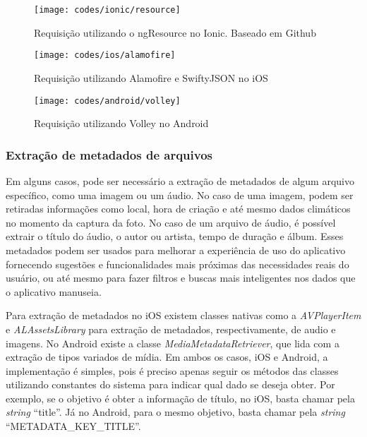 \begin{figure}[H]
	\centering
	\texttt{[image: codes/ionic/resource]}
	\caption[Requisição utilizando o ngResource no Ionic]{Requisição utilizando o ngResource no Ionic. Baseado em Github\protect\footnotemark}
	\label{fig:resource-ionic}
\end{figure}
\begin{figure}[H]
	\centering
	\texttt{[image: codes/ios/alamofire]}
	\caption[Requisição utilizando Alamofire e SwiftyJSON no iOS]{Requisição utilizando Alamofire e SwiftyJSON no iOS}
	\label{fig:alamofire-ios}
\end{figure} 
\begin{figure}[H]
	\centering
	\texttt{[image: codes/android/volley]}
	\caption[Requisição utilizando Volley no Android]{Requisição utilizando Volley no Android}
	\label{fig:volley-android}
\end{figure}


\subsubsection{Extração de metadados de arquivos} \label{subsubsec:extracaometadata}
Em alguns casos, pode ser necessário a extração de metadados de algum arquivo específico, como uma imagem ou um áudio. No caso de uma imagem, podem ser retiradas informações como local, hora de criação e até mesmo 
dados climáticos no momento da captura da foto. No caso de um arquivo de áudio, é possível extrair o título do áudio, o autor ou artista, tempo de duração e álbum. Esses metadados podem ser usados para 
melhorar a experiência de uso do aplicativo fornecendo sugestões e funcionalidades mais próximas das necessidades reais do usuário, ou até mesmo para fazer filtros e buscas mais inteligentes nos dados que o 
aplicativo manuseia. 

Para extração de metadados no iOS existem classes nativas como a \textit{AVPlayerItem} e \textit{ALAssetsLibrary} para extração de metadados, respectivamente, de audio e imagens. No Android existe a 
classe \textit{MediaMetadataRetriever}, que lida com a extração de tipos variados de mídia. Em ambos os casos, iOS e Android, a implementação é simples, pois é preciso apenas seguir os métodos das classes 
utilizando constantes do sistema para indicar qual dado se deseja obter. Por exemplo, se o objetivo é obter a informação de título, no iOS, basta chamar pela \textit{string} ``title''. Já no Android, para o mesmo 
objetivo, basta chamar pela \textit{string} ``METADATA\_KEY\_TITLE''.

